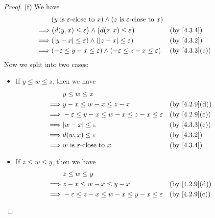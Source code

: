 \begin{proof}{(f)}
  We have
  \begin{align*}
             & (y \text{ is } \varepsilon\text{-close to } x) \land (z \text{ is } \varepsilon\text{-close to } x)                                  \\
    \implies & \big(d(y, x) \leq \varepsilon\big) \land \big(d(z, x) \leq \varepsilon\big)                         &  & \by{4.3.4}                  \\
    \implies & (\abs{y - x} \leq \varepsilon) \land (\abs{z - x} \leq \varepsilon)                                 &  & \by{4.3.2}                  \\
    \implies & (-\varepsilon \leq y - x \leq \varepsilon) \land (-\varepsilon \leq z - x \leq \varepsilon).        &  & \text{(by \cref{4.3.3}(c))}
  \end{align*}
  Now we split into two cases:
  \begin{itemize}
    \item If \(y \leq w \leq z\), then we have
          \begin{align*}
                     & y \leq w \leq z                                                                                 \\
            \implies & y - x \leq w - x \leq z - x                                    &  & \text{(by \cref{4.2.9}(d))} \\
            \implies & -\varepsilon \leq y - x \leq w - x \leq z - x \leq \varepsilon &  & \text{(by \cref{4.2.9}(c))} \\
            \implies & \abs{w - x} \leq \varepsilon                                   &  & \text{(by \cref{4.3.3}(c))} \\
            \implies & d(w, x) \leq \varepsilon                                       &  & \by{4.3.2}                  \\
            \implies & w \text{ is } \varepsilon\text{-close to } x.                  &  & \by{4.3.4}
          \end{align*}
    \item If \(z \leq w \leq y\), then we have
          \begin{align*}
                     & z \leq w \leq y                                                                                 \\
            \implies & z - x \leq w - x \leq y - x                                    &  & \text{(by \cref{4.2.9}(d))} \\
            \implies & -\varepsilon \leq z - x \leq w - x \leq y - x \leq \varepsilon &  & \text{(by \cref{4.2.9}(c))} \\

\end{align*}
\end{itemize}
\end{proof}
